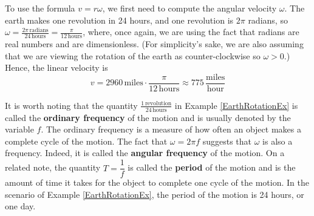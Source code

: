 \medskip

{  To use the formula $v = r \omega$, we first need to compute the angular velocity $\omega$.  The earth makes one revolution in 24 hours, and one revolution is $2 \pi$ radians, so $\omega = \frac{2 \pi \, \text{radians}}{24 \, \text{hours}} = \frac{\pi}{12 \, \text{hours}}$, where, once again, we are using the fact that radians are real numbers and are dimensionless. (For simplicity's sake, we are also assuming that we are viewing the rotation of the earth as counter-clockwise so $\omega > 0$.)  Hence, the linear velocity is \[ v = 2960 \, \text{miles} \cdot \frac{\pi}{12 \, \text{hours}} \approx 775 \, \frac{\text{miles}}{\text{hour}}\] }

\medskip

It is worth noting that the quantity $\frac{1 \, \text{revolution}}{24 \, \text{hours}}$ in Example \ref{EarthRotationEx} is called the   \textbf{ordinary frequency} of the motion and is usually denoted by the variable $f$.  The ordinary frequency is a measure of how often an object makes a complete cycle of the motion.  The fact that $\omega = 2\pi f$ suggests that $\omega$ is also a frequency.  Indeed, it is called the   \textbf{angular frequency} of the motion.  On a related note, the quantity $T = \dfrac{1}{f}$ is called the \textbf{period} of the motion and is the amount of time it takes for the object to complete one cycle of the motion.  In the scenario of Example \ref{EarthRotationEx}, the period of the motion is 24 hours, or one day.  

\smallskip

